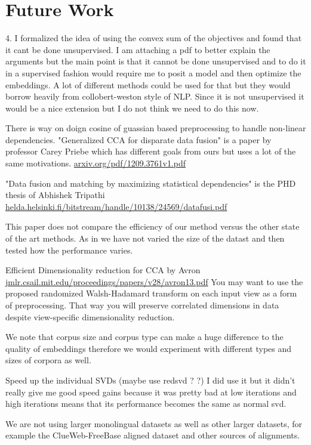 \documentclass[11pt]{article}
\begin{document}
\section{Future Work}
\label{sec:futurework}
4. I formalized the idea of using the convex sum of the objectives and
found that it cant be done unsupervised. I am attaching a pdf to
better explain the arguments but the main point is that it cannot be
done unsupervised and to do it in a supervised fashion would require
me to posit a model and then optimize the embeddings. A lot of
different methods could be used for that but they would borrow heavily
from collobert-weston style of NLP. Since it is not unsupervised it
would be a nice extension but I do not think we need to do this now.

There is way on doign cosine of guassian based preprocessing to handle
non-linear dependencies. 
"Generalized CCA for disparate data fusion" is a paper by professor
Carey Priebe which has different goals from ours but uses a lot of the
same motivations. \url{arxiv.org/pdf/1209.3761v1.pdf} 

"Data fusion and matching by maximizing statistical dependencies" is
the PHD thesis of Abhishek Tripathi  
\url{helda.helsinki.fi/bitstream/handle/10138/24569/datafusi.pdf}

This paper does not compare the efficiency of our method versus the
other state of the art methods. As in we have not varied the size of
the datast and then tested how the performance varies. 

Efficient Dimensionality reduction for CCA by Avron
\url{jmlr.csail.mit.edu/proceedings/papers/v28/avron13.pdf} 
You may want to use the proposed randomized Walsh-Hadamard transform
on each input view as a form of preprocessing. That way you will
preserve correlated dimensions in data despite view-specific
dimensionality reduction.

We note that corpus size and corpus type can make a huge
  difference to the quality of embeddings therefore we would
  experiment with different types and sizes of corpora as well.
  
Speed up the individual SVDs (maybe use redsvd ? ?) I did use it but
it didn't really give me good speed gains because it was pretty bad at
low iterations and high iterations means that its performance becomes
the same as normal svd.

We are not using larger monolingual datasets as well as other larger
datasets, for example the ClueWeb-FreeBase aligned dataset and other
sources of alignments.
\end{document}
